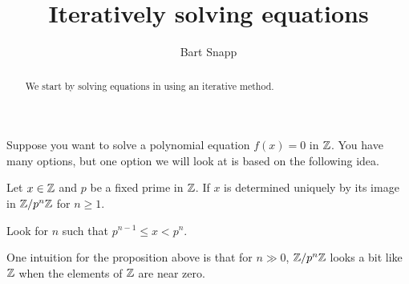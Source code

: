 \documentclass{ximera}
\author{Bart Snapp}
\title{Iteratively solving equations}
\begin{document}
\begin{abstract}
  We start by solving equations in using an iterative method.
\end{abstract}
\maketitle


Suppose you want to solve a polynomial equation $f(x)=0$ in $\mathbb Z$. You
have many options, but one option we will look at is based on the
following idea.


\begin{proposition}
  Let $x\in\mathbb Z$ and $p$ be a fixed prime in $\mathbb Z$. If $x$ is determined
  uniquely by its image in $\mathbb Z/p^n\mathbb Z$ for $n\ge 1$.
  \begin{sketch}
    Look for $n$ such that $p^{n-1}\le x < p^n$.
  \end{sketch}
\end{proposition}

One intuition for the proposition above is that for $n\gg 0$,
$\mathbb Z/p^n\mathbb Z$ looks a bit like $\mathbb Z$ when the elements of $\mathbb Z$ are near
zero.
\end{document}
